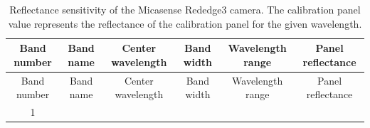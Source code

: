 \documentclass[]{article}
\begin{document}
\begin{longtable}[]{@{}cccccc@{}}
\caption{Reflectance sensitivity of the Micasense Rededge3 camera. The
calibration panel value represents the reflectance of the calibration
panel for the given wavelength.}\tabularnewline
\toprule
\begin{minipage}[b]{0.10\columnwidth}\centering\strut
Band number\strut
\end{minipage} & \begin{minipage}[b]{0.23\columnwidth}\centering\strut
Band name\strut
\end{minipage} & \begin{minipage}[b]{0.14\columnwidth}\centering\strut
Center wavelength\strut
\end{minipage} & \begin{minipage}[b]{0.09\columnwidth}\centering\strut
Band width\strut
\end{minipage} & \begin{minipage}[b]{0.14\columnwidth}\centering\strut
Wavelength range\strut
\end{minipage} & \begin{minipage}[b]{0.14\columnwidth}\centering\strut
Panel reflectance\strut
\end{minipage}\tabularnewline
\midrule
\endfirsthead
\toprule
\begin{minipage}[b]{0.10\columnwidth}\centering\strut
Band number\strut
\end{minipage} & \begin{minipage}[b]{0.23\columnwidth}\centering\strut
Band name\strut
\end{minipage} & \begin{minipage}[b]{0.14\columnwidth}\centering\strut
Center wavelength\strut
\end{minipage} & \begin{minipage}[b]{0.09\columnwidth}\centering\strut
Band width\strut
\end{minipage} & \begin{minipage}[b]{0.14\columnwidth}\centering\strut
Wavelength range\strut
\end{minipage} & \begin{minipage}[b]{0.14\columnwidth}\centering\strut
Panel reflectance\strut
\end{minipage}\tabularnewline
\midrule
\endhead
\begin{minipage}[t]{0.10\columnwidth}\centering\strut
1\strut
\end{minipage} & \begin{minipage}[t]{0.23\columnwidth}\centering\strut

\end{minipage}
\end{longtable}
\end{document}
